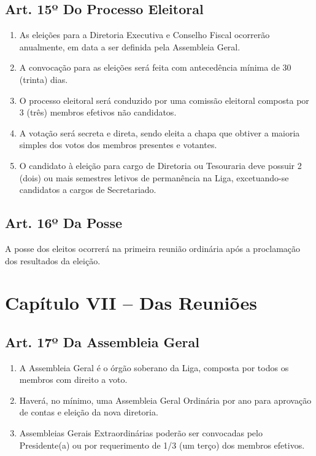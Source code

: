\documentclass[12pt, a4paper]{article}
\begin{document}
\subsection{Art. 15º Do Processo Eleitoral}
\begin{enumerate}[label=\S \arabic*.]
    \item As eleições para a Diretoria Executiva e Conselho Fiscal ocorrerão anualmente, em data a ser definida pela Assembleia Geral.
    \item A convocação para as eleições será feita com antecedência mínima de 30 (trinta) dias.
    \item O processo eleitoral será conduzido por uma comissão eleitoral composta por 3 (três) membros efetivos não candidatos.
    \item A votação será secreta e direta, sendo eleita a chapa que obtiver a maioria simples dos votos dos membros presentes e votantes.
    \item O candidato à eleição para cargo de Diretoria ou Tesouraria deve possuir 2 (dois) ou mais semestres letivos de permanência na Liga, excetuando-se candidatos a cargos de Secretariado.
\end{enumerate}

\subsection{Art. 16º Da Posse}
A posse dos eleitos ocorrerá na primeira reunião ordinária após a proclamação dos resultados da eleição.


\section{Capítulo VII – Das Reuniões}


\subsection{Art. 17º Da Assembleia Geral}
\begin{enumerate}[label=\S \arabic*.]
    \item A Assembleia Geral é o órgão soberano da Liga, composta por todos os membros com direito a voto.
    \item Haverá, no mínimo, uma Assembleia Geral Ordinária por ano para aprovação de contas e eleição da nova diretoria.
    \item Assembleias Gerais Extraordinárias poderão ser convocadas pelo Presidente(a) ou por requerimento de 1/3 (um terço) dos membros efetivos.
\end{enumerate}
\end{document}
